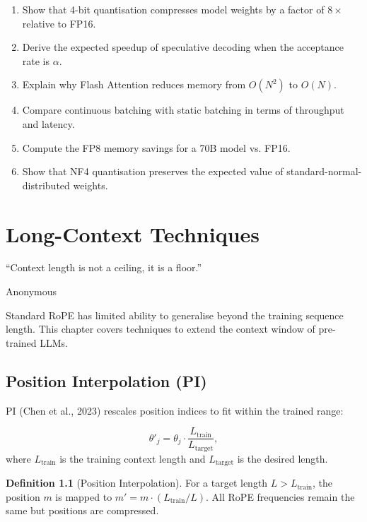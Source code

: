 \documentclass[11pt,a4paper]{book}
\theoremstyle{definition}
\newtheorem{definition}{Definition}[chapter]
\begin{document}
\begin{enumerate}
	\item Show that 4-bit quantisation compresses model weights by a factor of $8\times$ relative to FP16.
	\item Derive the expected speedup of speculative decoding when the acceptance rate is $\alpha$.
	\item Explain why Flash Attention reduces memory from $O(N^2)$ to $O(N)$.
	\item Compare continuous batching with static batching in terms of throughput and latency.
	\item Compute the FP8 memory savings for a 70B model vs. FP16.
	\item Show that NF4 quantisation preserves the expected value of standard-normal-distributed weights.
\end{enumerate}

\chapter{Long-Context Techniques}
\label{ch:long-context}

\epigraph{``Context length is not a ceiling, it is a floor.''}{Anonymous}

Standard RoPE has limited ability to generalise beyond the training sequence length. This chapter covers techniques to extend the context window of pre-trained LLMs.

\section{Position Interpolation (PI)}

PI (Chen et al., 2023) rescales position indices to fit within the trained range:

\begin{equation}
	\theta'_j = \theta_j \cdot \frac{L_{\text{train}}}{L_{\text{target}}},
\end{equation}
where $L_{\text{train}}$ is the training context length and $L_{\text{target}}$ is the desired length.

\begin{definition}[Position Interpolation]
	For a target length $L > L_{\text{train}}$, the position $m$ is mapped to $m' = m \cdot (L_{\text{train}} / L)$. All RoPE frequencies remain the same but positions are compressed.
\end{definition}
\end{document}
